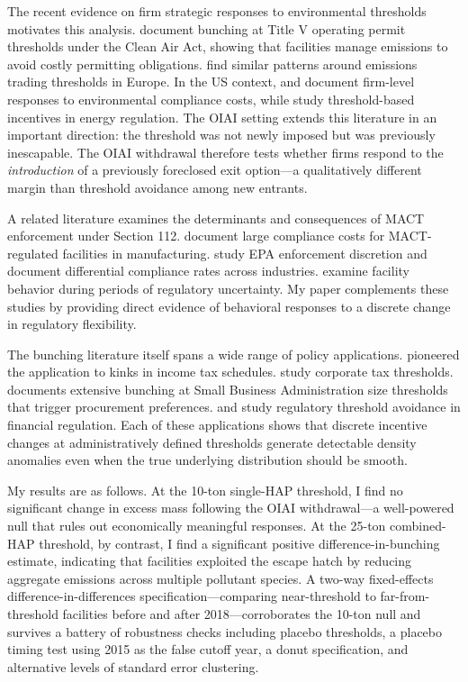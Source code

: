 \documentclass[12pt]{article}
\begin{document}
The recent evidence on firm strategic responses to environmental thresholds motivates this analysis. \citet{OzaltunShapiroWalker2025} document bunching at Title V operating permit thresholds under the Clean Air Act, showing that facilities manage emissions to avoid costly permitting obligations. \citet{GrafstroemKitchener2021} find similar patterns around emissions trading thresholds in Europe. In the US context, \citet{GibsonKalouptsidi2017} and \citet{BauerDraca2022} document firm-level responses to environmental compliance costs, while \citet{HendricksKhan2021} study threshold-based incentives in energy regulation. The OIAI setting extends this literature in an important direction: the threshold was not newly imposed but was previously inescapable. The OIAI withdrawal therefore tests whether firms respond to the \emph{introduction} of a previously foreclosed exit option---a qualitatively different margin than threshold avoidance among new entrants.

A related literature examines the determinants and consequences of MACT enforcement under Section 112. \citet{SinaiBurgard2021} document large compliance costs for MACT-regulated facilities in manufacturing. \citet{GrahamHeckman2018} study EPA enforcement discretion and document differential compliance rates across industries. \citet{AizenmanJain2019} examine facility behavior during periods of regulatory uncertainty. My paper complements these studies by providing direct evidence of behavioral responses to a discrete change in regulatory flexibility.

The bunching literature itself spans a wide range of policy applications. \citet{ChettyFriedmanOlsenPistaferri2011} pioneered the application to kinks in income tax schedules. \citet{DeveretteTaylor2011} study corporate tax thresholds. \citet{BunchingFirms2018} documents extensive bunching at Small Business Administration size thresholds that trigger procurement preferences. \citet{GabaixLaroccaWard2021} and \citet{KlimekRauch2022} study regulatory threshold avoidance in financial regulation. Each of these applications shows that discrete incentive changes at administratively defined thresholds generate detectable density anomalies even when the true underlying distribution should be smooth.

My results are as follows. At the 10-ton single-HAP threshold, I find no significant change in excess mass following the OIAI withdrawal---a well-powered null that rules out economically meaningful responses. At the 25-ton combined-HAP threshold, by contrast, I find a significant positive difference-in-bunching estimate, indicating that facilities exploited the escape hatch by reducing aggregate emissions across multiple pollutant species. A two-way fixed-effects difference-in-differences specification---comparing near-threshold to far-from-threshold facilities before and after 2018---corroborates the 10-ton null and survives a battery of robustness checks including placebo thresholds, a placebo timing test using 2015 as the false cutoff year, a donut specification, and alternative levels of standard error clustering.
\end{document}
